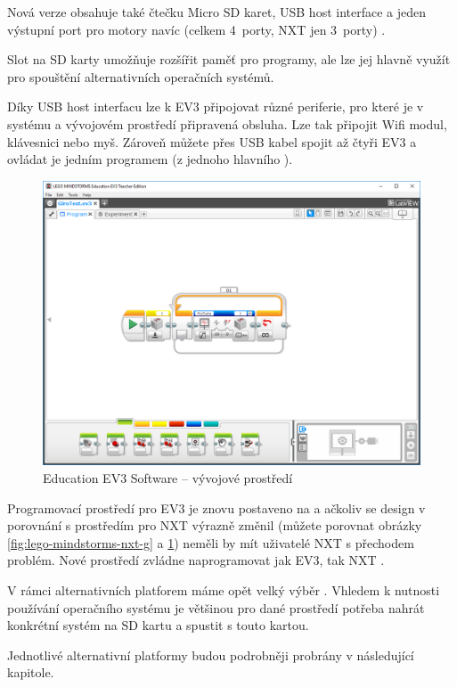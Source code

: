 
Nová verze obsahuje také čtečku Micro SD karet, USB host interface a jeden výstupní port pro motory navíc (celkem 4~porty, NXT jen 3~porty) \cite{legoBotBench_comparing-EV3-and-NXT}. 

Slot na SD karty umožňuje rozšířit paměť pro programy, ale lze jej hlavně využít pro spouštění alternativních operačních systémů. 

Díky USB host interfacu lze k EV3 připojovat různé periferie, pro které je v systému a vývojovém prostředí připravená obsluha.
Lze tak připojit Wifi modul, klávesnici nebo myš. 
Zároveň můžete přes USB kabel spojit až čtyři EV3  a ovládat je jedním programem (z jednoho hlavního ).

\begin{figure}[h]
	\centering
	\includegraphics[width=\textwidth]{images/lego-mindstorms-ev3_dev-soft.png}
	\caption[\legoM{ }Education EV3 Software -- vývojové prostředí]{\legoM{ }Education EV3 Software -- vývojové prostředí}
	\label{fig:lego-mindstorms-ev3_dev-soft}
\end{figure}

Programovací prostředí pro EV3 je znovu postaveno na \labview{ } a ačkoliv se design v porovnání s prostředím pro NXT výrazně změnil (můžete porovnat obrázky \ref{fig:lego-mindstorms-nxt-g} a \ref{fig:lego-mindstorms-ev3_dev-soft}) neměli by mít uživatelé NXT s přechodem problém. 
Nové prostředí zvládne naprogramovat jak EV3, tak NXT \brick{}.

V rámci alternativních platforem máme opět velký výběr \cite{legoMindstormsWikipedia_programming-languages}. 
Vhledem k nutnosti používání operačního systému je většinou pro dané prostředí potřeba nahrát konkrétní systém na SD kartu a spustit \brick{ }s touto kartou.

Jednotlivé alternativní platformy budou podrobněji probrány v následující kapitole.
